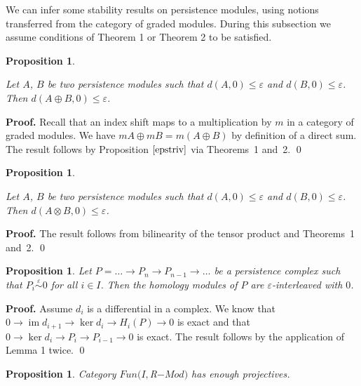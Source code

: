 \documentclass[english,12pt]{article}
\newcounter{stmcounter}[section]
\numberwithin{equation}{section}
\newtheorem{proposition}[stmcounter]{Proposition}
\theoremstyle{definition}
\theoremstyle{remark}
\newenvironment{pf}{\noindent\textbf{Proof.}}{\qed}
\renewcommand{\leq}{\leqslant}
\begin{document}
We can infer some stability results on persistence modules, using notions transferred from the category of graded modules. During this subsection we assume conditions of Theorem 1 or Theorem 2 to be satisfied.\\

\begin{proposition} ~ \par
  \label{prop:sum}
  Let $A$, $B$ be two persistence modules such that $d(A,0) \leq \varepsilon$ and $d(B,0) \leq \varepsilon$. Then $d(A \oplus B,0) \leq \varepsilon$.
\end{proposition}

\begin{pf}
  Recall that an index shift maps to a multiplication by $m$ in a category of graded modules. We have $mA \oplus mB = m(A \oplus B)$ by definition of a direct sum. The result follows by Proposition $\ref{epstriv}$ via Theorems~1 and~2.
\end{pf}

\begin{proposition} ~ \par
  \label{prop:tensor}
  Let $A$, $B$ be two persistence modules such that $d(A,0) \leq \varepsilon$ and $d(B,0) \leq \varepsilon$. Then $d(A \otimes B,0) \leq \varepsilon$.
\end{proposition}

\begin{pf}
  The result follows from bilinearity of the tensor product and Theorems~1 and~2.
\end{pf}

\begin{proposition}
  \label{prop:hominter}
  Let $P = \ldots \to P_n \to P_{n-1} \to \ldots$ be a persistence complex such that $P_i \stackrel{\varepsilon}{\sim} 0$ for all $i \in I$. Then the homology modules of $P$ are $\varepsilon$-interleaved with $0$.
\end{proposition}

\begin{pf}
  Assume $d_i$ is a differential in a complex. We know that $0 \to \operatorname{im}{d_{i+1}} \to \ker{d_{i}} \to H_i(P) \to 0$ is exact and that $0 \to \ker{d_i} \to P_i \to P_{i-1} \to 0$ is exact. The result follows by the application of Lemma 1 twice.
\end{pf}\\

\begin{proposition}
  Category $Fun(I, $R$-Mod)$ has enough projectives.
\end{proposition}
\end{document}
